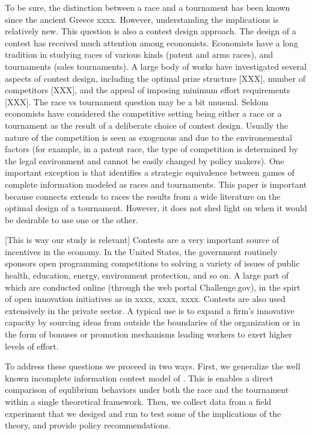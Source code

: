 \documentclass[12pt,]{article}
\begin{document}
To be sure, the distinction between a race and a tournament has been
known since the ancient Greece xxxx. However, understanding the
implications is relatively new. This question is also a contest design
approach. The design of a contest has received much attention among
economists. Economists have a long tradition in studying races of
various kinds (patent and arms races), and tournaments (sales
tournaments). A large body of works have investigated several aspects of
contest design, including the optimal prize structure {[}XXX{]}, number
of competitors {[}XXX{]}, and the appeal of imposing minimum effort
requirements {[}XXX{]}. The race vs tournament question may be a bit
unusual. Seldom economists have considered the competitive setting being
either a race or a tournament as the result of a deliberate choice of
contest design. Usually the nature of the competition is seen as
exogenous and due to the environemental factors (for example, in a
patent race, the type of competition is determined by the legal
environment and cannot be easily changed by policy makers). One
important exception is \citet{baye2003strategic} that identifies a
strategic equivalence between games of complete information modeled as
races and tournaments. This paper is important because connects extends
to races the results from a wide literature on the optimal design of a
tournament. However, it does not shed light on when it would be
desirable to use one or the other.

{[}This is way our study is relevant{]} Contests are a very important
source of incentives in the economy. In the United States, the
government routinely sponsors open programming competitions to solving a
variety of issues of public health, education, energy, environment
protection, and so on. A large part of which are conducted online
(through the web portal Challenge.gov), in the spirt of open innovation
initiatives as in xxxx, xxxx, xxxx. Contests are also used extensively
in the private sector. A typical use is to expand a firm's innovative
capacity by sourcing ideas from outside the boundaries of the
organization or in the form of bonuses or promotion mechanisms leading
workers to exert higher levels of effort.

To address these questions we proceed in two ways. First, we generalize
the well known incomplete information contest model of
\citet{moldovanu2001optimal}. This is enables a direct comparison of
equlibrium behaviors under both the race and the tournament within a
single theoretical framework. Then, we collect data from a field
experiment that we desiged and run to test some of the implications of
the theory, and provide policy recommendations.
\end{document}
